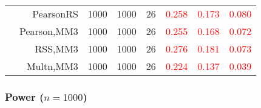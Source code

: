 \documentclass[
]{article}
\begin{document}
\begin{table}[H]
{\begin{tabular}[t]{lrrrrrrr}
\hspace{1em} & PearsonRS & 1000 & 1000 & 26 & \textcolor{red}{0.258} & \textcolor{red}{0.173} & \textcolor{red}{0.080}\\

\hspace{1em} & Pearson,MM3 & 1000 & 1000 & 26 & \textcolor{red}{0.255} & \textcolor{red}{0.168} & \textcolor{red}{0.072}\\

\hspace{1em} & RSS,MM3 & 1000 & 1000 & 26 & \textcolor{red}{0.276} & \textcolor{red}{0.181} & \textcolor{red}{0.073}\\

\hspace{1em} & Multn,MM3 & 1000 & 1000 & 26 & \textcolor{red}{0.224} & \textcolor{red}{0.137} & \textcolor{red}{0.039}\\
\bottomrule
\end{tabular}}
\endgroup{}
\end{table}

\hypertarget{power-n1000}{%
\subsubsection{\texorpdfstring{Power
(\(n=1000\))}{Power (n=1000)}}\label{power-n1000}}
\end{document}
